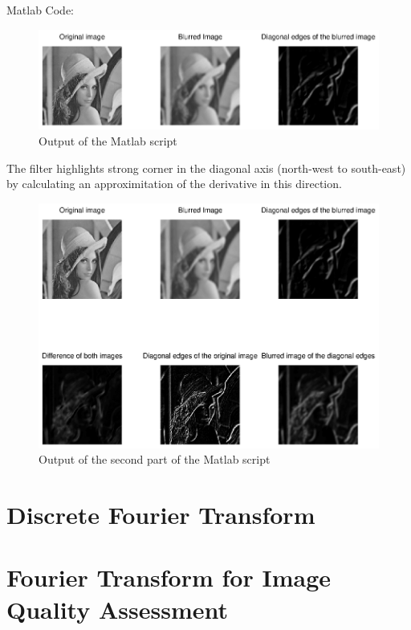 \documentclass[DIN, pagenumber=false, fontsize=11pt, parskip=half]{scrartcl}
\begin{document}
    \subsection{}
    Matlab Code:
                  
    \begin{figure}[H]
        \centering
        \includegraphics[trim = {0 13cm 27cm 0}, clip,width=\textwidth]{lenaEdge1.eps}
        \caption{Output of the Matlab script}
    \end{figure}
    The filter highlights strong corner in the diagonal axis (north-west to south-east) by calculating
    an approximitation of the derivative in this direction.

                  
    \begin{figure}[H]
        \centering
        \includegraphics[trim = {0 10cm 27cm 0}, clip,width=\textwidth]{lenaEdge2.eps}
        \caption{Output of the second part of the Matlab script}
    \end{figure}


    \section{Discrete Fourier Transform}

    \section{Fourier Transform for Image Quality Assessment}
\end{document}
